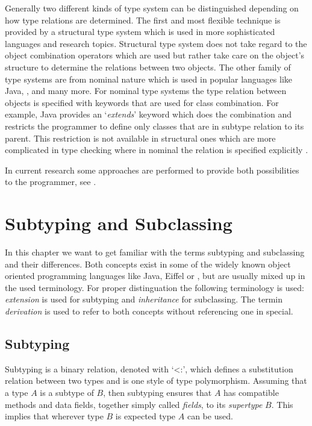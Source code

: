 Generally two different kinds of type system can be distinguished
depending on how type relations are determined. The first and most
flexible technique is provided by a structural type system which is used
in more sophisticated languages and research topics. Structural type
system does not take regard to the object combination operators which
are used but rather take care on the object's structure to determine the
relations between two objects. The other family of type systems are from
nominal nature which is used in popular languages like Java, \cs, \cpp
and many more. For nominal type systems the type relation between objects
is specified with keywords that are used for class combination. For
example, Java provides an `\emph{extends}' keyword which does the combination
and restricts the programmer to define only classes that are in subtype
relation to its parent. This restriction is not available in structural
ones which are more complicated in type checking where in nominal the
relation is specified explicitly \cite{malayeri_integrating_2008,pierce_types_2002}.

In current research some approaches are performed
to provide both possibilities to the programmer, see
\cite{findler_semantic_2004,gil_whiteoak:_2008,malayeri_integrating_2008}.

\section{Subtyping and Subclassing}
\label{chap:subtypingVsSubclassing}
In this chapter we want to get familiar with the terms subtyping and
subclassing and their differences. Both concepts exist in some of the
widely known object oriented programming languages like Java, Eiffel
or \cpp, but are usually mixed up in the used terminology. For proper
distinguation the following terminology is used: \emph{extension} is
used for subtyping and \emph{inheritance} for subclassing. The termin
\emph{derivation} is used to refer
to both concepts without referencing one in special.

\subsection{Subtyping}
 Subtyping is a binary relation, denoted with
`<:', which defines a substitution relation between two types and is one
style of type polymorphism. Assuming that a type $A$ is a subtype of $B$,
then subtyping ensures that $A$ has compatible methods and data fields,
together simply called \emph{fields}, to its \emph{supertype} $B$. This
implies that wherever type $B$ is expected type $A$ can be used.


